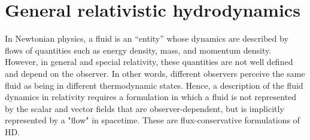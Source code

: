 %
%
%
%
%
%
%



\section{General relativistic hydrodynamics}\label{sec:theory:grhd}


In Newtonian physics, a fluid is an ``entity'' whose dynamics are described by flows of 
quantities such as energy density, mass, and momentum density. However, in general and 
special relativity, these quantities are not well defined and depend on the observer. 
In other words, different observers perceive the same fluid as being in different thermodynamic 
states. Hence, a description of the fluid dynamics in relativity requires 
a formulation in which a fluid is not represented by the scalar and vector fields  
that are observer-dependent, but is implicitly represented by a "flow" in spacetime. 
These are flux-conservative formulations of \ac{HD}.


